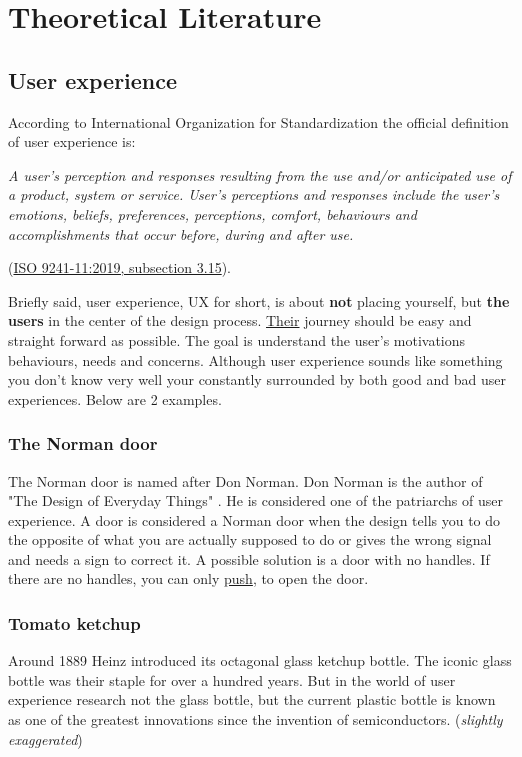 \chapter{Theoretical Literature}

\section{User experience}
According to International Organization for Standardization the official definition of user experience is: 
\begin{displayquote}
    \textit{A user's perception and responses resulting from the use and/or anticipated use of a product, system or service.
    User's perceptions and responses include the user's emotions, beliefs, preferences, perceptions, comfort, behaviours and accomplishments that occur before, during and after use.}

    (\href{https://www.iso.org/obp/ui/#iso:std:iso:9241:-210:ed-2:v1:en}{ISO 9241-11:2019, subsection 3.15}).
\end{displayquote}

Briefly said, user experience, UX for short, is about \textbf{not} placing yourself, but \textbf{the users} in the center of the design process. \underline{Their} journey should be easy and straight forward as possible. The goal is understand the user's motivations behaviours, needs and concerns. Although user experience sounds like something you don't know very well your constantly surrounded by both good and bad user experiences. Below are 2 examples.

\subsection{The Norman door}
The Norman door is named after Don Norman. Don Norman is the author of "The Design of Everyday Things" \cite{Norman2013}. He is considered one of the patriarchs of user experience. A door is considered a Norman door when the design tells you to do the opposite of what you are actually supposed to do or gives the wrong signal and needs a sign to correct it.
A possible solution is a door with no handles. If there are no handles, you can only \underline{push}, to open the door.

\subsection{Tomato ketchup}
Around 1889 Heinz introduced its octagonal glass ketchup bottle. The iconic glass bottle was their staple for over a hundred years. But in the world of user experience research not the glass bottle, but the current plastic bottle is known as one of the greatest innovations since the invention of semiconductors. (\textit{slightly exaggerated})

